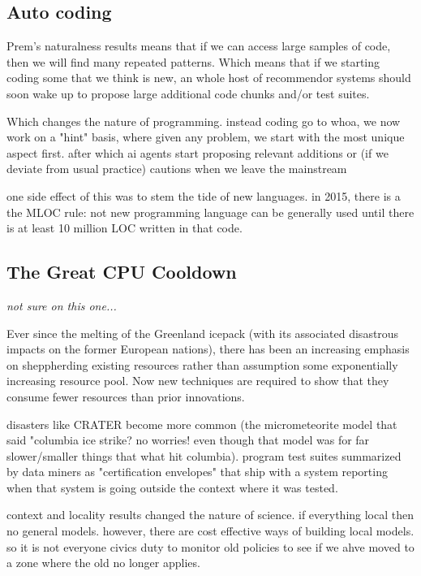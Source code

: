 \documentclass[journal]{IEEEtran}
\begin{document}
\begin{itemize}
{\section{Auto coding}

Prem's naturalness results means that if we can access large samples of code,
then we will find many repeated patterns. Which means that if we starting coding some that we think is new, an whole host of recommendor  systems should soon   wake up to propose large additional code chunks and/or test suites. 

Which changes the nature of programming. instead coding go to whoa, we now work on a "hint" basis, where given any problem, we start with the most unique aspect first. after which ai agents start proposing relevant additions or (if we deviate from usual practice) cautions when we leave the mainstream

one side effect of this was to stem the tide of new languages. in 2015, there is a the MLOC rule: not new programming language can be generally used until there is at least 10 million LOC written in that code.  

\subsection{The Great CPU Cooldown}

{\em not sure on this one...}

Ever since the melting of the Greenland icepack (with its associated disastrous impacts on the former European nations), there has been an increasing emphasis on sheppherding existing resources rather than assumption some exponentially increasing resource pool. Now new techniques are required to show that they consume fewer resources than prior innovations. 



disasters like CRATER become more common (the micrometeorite model that said "columbia ice strike? no worries! even though that model was for far slower/smaller things that what hit columbia). program test suites summarized by data miners as "certification envelopes" that ship with a system reporting when that system is going outside the context where it was tested.

context and locality results changed the nature of science. if everything local then no general models. however, there are cost effective ways of building local models. so it is not everyone civics duty to monitor old policies to see if we ahve moved to a zone where the old no longer applies.

}
\end{itemize}
\end{document}

